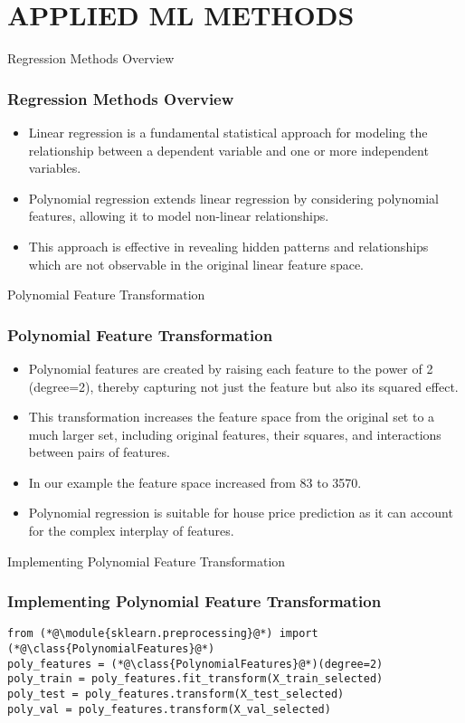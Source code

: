 \section{APPLIED ML METHODS}
\label{applied_ml_methods}


\begin{frame}{Regression Methods Overview}
    \frametitle{Regression Methods Overview}
    \begin{itemize}
        \item Linear regression is a fundamental statistical approach for modeling the relationship between a dependent variable and one or more independent variables.
        \item Polynomial regression extends linear regression by considering polynomial features, allowing it to model non-linear relationships.
        \item This approach is effective in revealing hidden patterns and relationships which are not observable in the original linear feature space.
    \end{itemize}
\end{frame}

\begin{frame}{Polynomial Feature Transformation}
    \frametitle{Polynomial Feature Transformation}
    \begin{itemize}
        \item Polynomial features are created by raising each feature to the power of 2 (degree=2), thereby capturing not just the feature but also its squared effect.
        \item This transformation increases the feature space from the original set to a much larger set, including original features, their squares, and interactions between pairs of features.
        \item In our example the feature space increased from 83 to 3570.
        \item Polynomial regression is suitable for house price prediction as it can account for the complex interplay of features.
    \end{itemize}
\end{frame}

\begin{frame}[fragile]{Implementing Polynomial Feature Transformation}
    \frametitle{Implementing Polynomial Feature Transformation}
    \begin{lstlisting}[caption={Polynomial feature transformation using sklearn.preprocessing.}, label=lst:polynomial_feature_transformation]
from (*@\module{sklearn.preprocessing}@*) import (*@\class{PolynomialFeatures}@*)
poly_features = (*@\class{PolynomialFeatures}@*)(degree=2)
poly_train = poly_features.fit_transform(X_train_selected)
poly_test = poly_features.transform(X_test_selected)
poly_val = poly_features.transform(X_val_selected)
    \end{lstlisting}
\end{frame}

